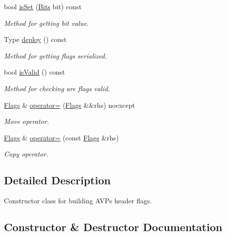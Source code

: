 \begin{DoxyCompactItemize}
bool \hyperlink{classDiameter_1_1AVP_1_1Header_1_1Flags_a8828e3f2e9d6242d8577178f6a910efd}{is\+Set} (\hyperlink{classDiameter_1_1AVP_1_1Header_1_1Flags_af24fa00d6135e01a5b58c9ae84245262}{Bits} bit) const
\begin{DoxyCompactList}\small\item\em Method for getting bit value. \end{DoxyCompactList}\item 
Type \hyperlink{classDiameter_1_1AVP_1_1Header_1_1Flags_aad359a4a25b2998c813c0923e67efeb8}{deploy} () const
\begin{DoxyCompactList}\small\item\em Method for getting flags serialized. \end{DoxyCompactList}\item 
bool \hyperlink{classDiameter_1_1AVP_1_1Header_1_1Flags_a6ab05074bd270c9593f524151443c879}{is\+Valid} () const
\begin{DoxyCompactList}\small\item\em Method for checking are flags valid. \end{DoxyCompactList}\item 
\hyperlink{classDiameter_1_1AVP_1_1Header_1_1Flags}{Flags} \& \hyperlink{classDiameter_1_1AVP_1_1Header_1_1Flags_aef292134b9d9f7c46a382ffdf95327ba}{operator=} (\hyperlink{classDiameter_1_1AVP_1_1Header_1_1Flags}{Flags} \&\&rhs) noexcept
\begin{DoxyCompactList}\small\item\em Move operator. \end{DoxyCompactList}\item 
\hyperlink{classDiameter_1_1AVP_1_1Header_1_1Flags}{Flags} \& \hyperlink{classDiameter_1_1AVP_1_1Header_1_1Flags_a7d71a49f3122bd5930a6b93b482999ce}{operator=} (const \hyperlink{classDiameter_1_1AVP_1_1Header_1_1Flags}{Flags} \&rhs)
\begin{DoxyCompactList}\small\item\em Copy operator. \end{DoxyCompactList}\end{DoxyCompactItemize}


\subsection{Detailed Description}
Constructor class for building A\+V\+Ps header flags. 

\subsection{Constructor \& Destructor Documentation}
\mbox{\label{classDiameter_1_1AVP_1_1Header_1_1Flags_aafe29286cfb1709d9bc5b23106e62d70}} 
